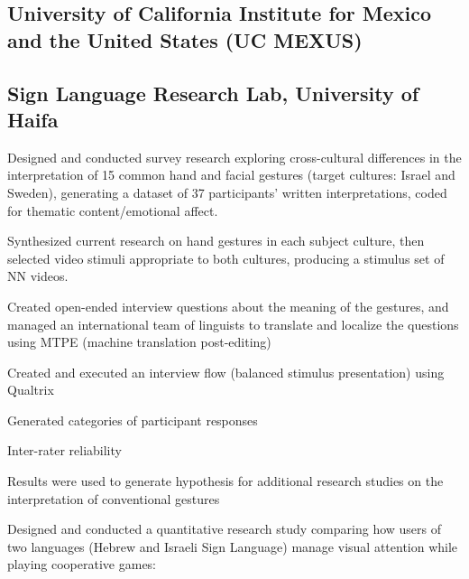 \subsection{University of California Institute for Mexico and the United States (UC MEXUS)}

\subsection{Sign Language Research Lab, University of Haifa}

Designed and conducted survey research exploring cross-cultural differences in the interpretation of 15 common hand and facial gestures (target cultures: Israel and Sweden), generating a dataset of 37 participants' written interpretations, coded for thematic content/emotional affect.


Synthesized current research on hand gestures in each subject culture, then selected video stimuli appropriate to both cultures, producing a stimulus set of NN videos.

Created open-ended interview questions about the meaning of the gestures, and managed an international team of linguists to translate and localize the questions using MTPE (machine translation post-editing)

Created and executed an interview flow (balanced stimulus presentation) using Qualtrix

Generated categories of participant responses

Inter-rater reliability

Results were used to generate hypothesis for additional research studies on the interpretation of conventional gestures



Designed and conducted a quantitative research study comparing how users of two languages (Hebrew and Israeli Sign Language) manage visual attention while playing cooperative games:

